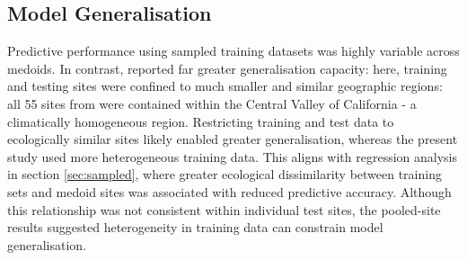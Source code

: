 



\subsection{Model Generalisation}
\par Predictive performance using sampled training datasets was highly variable across medoids. In contrast, \textcite{ahmadi2025enhancing} reported far greater generalisation capacity: here, training and testing sites were confined to much smaller and similar geographic regions: all 55 sites from \textcite{ahmadi2025enhancing} were contained within the Central Valley of California - a climatically homogeneous region. Restricting training and test data to ecologically similar sites likely enabled greater generalisation, whereas the present study used more heterogeneous training data. This aligns with regression analysis in section \ref{sec:sampled}, where greater ecological dissimilarity between training sets and medoid sites was associated with reduced predictive accuracy. Although this relationship was not consistent within individual test sites, the pooled-site results suggested heterogeneity in training data can constrain model generalisation.


